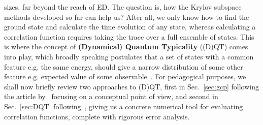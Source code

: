 sizes, far beyond the reach of ED. The question is, how the Krylov subspace methods developed so far can help us?
After all, we only know how to find the ground state and calculate the time evolution of any state, whereas
calculating a correlation function requires taking the trace over a full ensemble of states. This is where the concept 
of \textbf{(Dynamical) Quantum Typicality} ((D)QT) comes into play, which broadly speaking postulates that
a set of states with a common feature e.g. the same energy, should give a narrow distribution of some
other feature e.g. expected value of some observable~\autocite{Bartsch2009a}. For pedagogical purposes, we shall
now briefly review two approaches to (D)QT, first in Sec.~\ref{sec:gcp} following the article by~\textcite{Popescu2006} focusing
on a conceptual point of view, and second in Sec.~\ref{sec:DQT} following~\textcite{Bartsch2009a, Steinigeweg2014a}, giving us
a concrete numerical tool for evaluating correlation functions, complete with rigorous error analysis.

